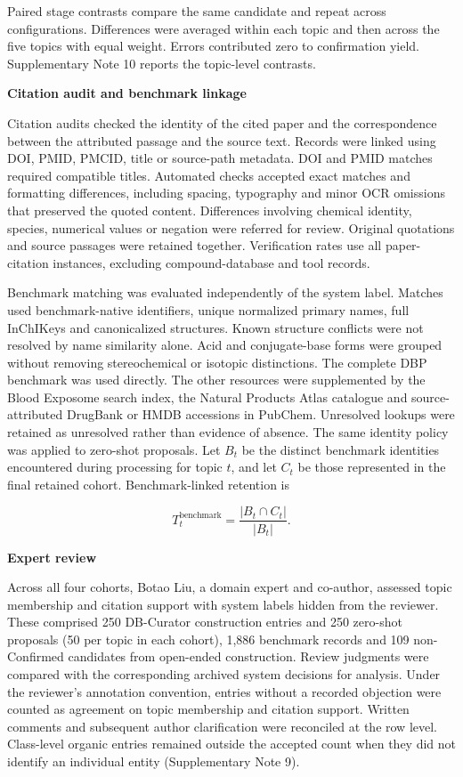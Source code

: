 \documentclass[
]{article}
\begin{document}
Paired stage contrasts compare the same candidate and repeat across configurations. Differences were averaged within each topic and then across the five topics with equal weight. Errors contributed zero to confirmation yield. Supplementary Note 10 reports the topic-level contrasts.

\textbf{Citation audit and benchmark linkage}

Citation audits checked the identity of the cited paper and the correspondence between the attributed passage and the source text. Records were linked using DOI, PMID, PMCID, title or source-path metadata. DOI and PMID matches required compatible titles. Automated checks accepted exact matches and formatting differences, including spacing, typography and minor OCR omissions that preserved the quoted content. Differences involving chemical identity, species, numerical values or negation were referred for review. Original quotations and source passages were retained together. Verification rates use all paper-citation instances, excluding compound-database and tool records.

Benchmark matching was evaluated independently of the system label. Matches used benchmark-native identifiers, unique normalized primary names, full InChIKeys and canonicalized structures. Known structure conflicts were not resolved by name similarity alone. Acid and conjugate-base forms were grouped without removing stereochemical or isotopic distinctions. The complete DBP benchmark was used directly. The other resources were supplemented by the Blood Exposome search index, the Natural Products Atlas catalogue and source-attributed DrugBank or HMDB accessions in PubChem. Unresolved lookups were retained as unresolved rather than evidence of absence. The same identity policy was applied to zero-shot proposals. Let $B_t$ be the distinct benchmark identities encountered during processing for topic $t$, and let $C_t$ be those represented in the final retained cohort. Benchmark-linked retention is

\[T_t^{\mathrm{benchmark}}=\frac{|B_t\cap C_t|}{|B_t|}.\]

\textbf{Expert review}

Across all four cohorts, Botao Liu, a domain expert and co-author, assessed topic membership and citation support with system labels hidden from the reviewer. These comprised 250 DB-Curator construction entries and 250 zero-shot proposals (50 per topic in each cohort), 1,886 benchmark records and 109 non-Confirmed candidates from open-ended construction. Review judgments were compared with the corresponding archived system decisions for analysis. Under the reviewer's annotation convention, entries without a recorded objection were counted as agreement on topic membership and citation support. Written comments and subsequent author clarification were reconciled at the row level. Class-level organic entries remained outside the accepted count when they did not identify an individual entity (Supplementary Note 9).
\end{document}

